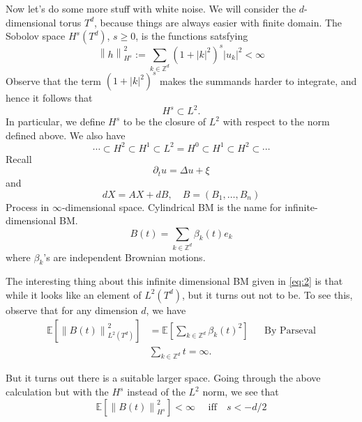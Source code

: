 \documentclass{article}
\def\Z{\mathbb{Z}} %
\def\E{\mathbb{E}} %
\newcommand\norm[1]{\left\lVert#1\right\rVert}
\begin{document}
Now let's do some more stuff with white noise. We will consider the
$d$-dimensional torus $T^{d}$, because things are always easier with finite
domain. The Sobolov space $H^{s}(T^{d})$, $s \geq 0$,  is the functions
satsfying
\begin{equation*}
  \norm{h}_{H^{s}}^{2} := \sum_{k\in \Z^{d}}\left( 1+|k|^{2} \right)^{s}|u_{k}|^{2}<\infty  
\end{equation*}
Observe that the term $\left( 1+|k|^{2} \right)^{s}$ makes the summands harder
to integrate, and hence it follows that
\begin{equation*}
  H^{s}\subset L^{2}.
\end{equation*}
In particular, we define $H^{s}$ to be the closure of $L^{2}$ with respect to
the norm defined above. We also have
\begin{equation*}
  \cdots \subset H^{2}\subset H^{1} \subset L^{2} = H^{0} \subset H^{1} \subset H^{2}\subset \cdots
\end{equation*}
Recall
\begin{equation*}
  \partial_{t}u = \Delta u+\xi
\end{equation*}
and
\begin{equation*}
  dX = AX+dB, \quad B=(B_{1},\ldots,B_{n})
\end{equation*}
Process in $\infty$-dimensional space. Cylindrical BM is the name for
infinite-dimensional BM.
\begin{equation} \label{eq:2}
  B(t) = \sum_{k\in \Z^{d}}\beta_{k}(t)e_{k} 
\end{equation}
where $\beta_{k}$'s are independent Brownian motions.

The interesting thing about this infinite dimensional BM given in \cref{eq:2} is
that while it looks like an element of $L^{2}(T^{d})$, but it turns out not to be. To
see this, observe that for any dimension $d$, we have
\begin{align*}
  \E\left[\norm{B(t)}_{L^{2}(T^{d})}^{2} \right]
  &=\E\left[\sum_{k\in \Z^{d}}\beta_{k}(t)^{2}  \right]
    &&\text{By Parseval}\\
  &\sum_{k\in \Z^{d}}t = \infty.
\end{align*}

But it turns out there is a suitable larger space. Going through the above
calculation but with the $H^{s}$  instead of the $L^{2}$ norm, we see that
\begin{equation*}
  \E\left[\norm{B(t)}_{H^{s}}^{2} \right] <\infty
  \quad \text{ iff} \quad
  s<-d/2
\end{equation*}
\end{document}
